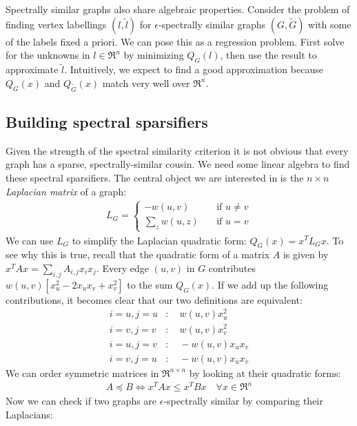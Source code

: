 \documentclass{article}
\begin{document}
Spectrally similar graphs also share algebraic properties. Consider the
problem of finding vertex labellings $(l, \tilde{l})$ for
$\epsilon$-spectrally similar graphs $(G, \tilde{G})$ with some of the
labels fixed a priori. We can pose this as a regression problem. First solve
for the unknowns in $l \in \Re^n$ by minimizing $Q_G(l)$, then use the
result to approximate $\tilde{l}$. Intuitively, we expect to find a good
approximation because $Q_G(x)$ and $Q_{\tilde{G}}(x)$ match very well over
$\Re^n$.

\subsection{Building spectral sparsifiers}

Given the strength of the spectral similarity criterion it is not obvious
that every graph has a sparse, spectrally-similar cousin. We need some
linear algebra to find these spectral sparsifiers. The central object we are
interested in is the $n \times n$ \textit{Laplacian matrix} of a graph:
\begin{align*}
    L_G =
    \begin{cases}
        -w(u, v) \quad &\text{if } u \not= v \\
        \sum_{z} w(u, z) \quad &\text{if } u = v
    \end{cases}
\end{align*}
We can use $L_G$ to simplify the Laplacian quadratic form: $Q_G(x) =
x^TL_Gx$. To see why this is true, recall that the quadratic form of a
matrix $A$ is given by $x^TAx = \sum_{i,j} A_{i,j}x_ix_j$.  Every edge $(u,
v)$ in $G$ contributes $w(u, v)[x_u^2 - 2x_ux_v + x_v^2]$ to the sum
$Q_G(x)$. If we add up the following contributions, it becomes clear that
our two definitions are equivalent:
\begin{align*}
    i = u, j = u &:\quad w(u, v)x_u^2 \\
    i = v, j = v &:\quad w(u, v)x_v^2 \\
    i = u, j = v &:\quad -w(u, v)x_ux_v \\
    i = v, j = u &:\quad -w(u, v)x_ux_v
\end{align*}
We can order symmetric matrices in $\Re^{n \times n}$ by looking at their
quadratic forms:
\begin{align*}
    A \preceq B \Leftrightarrow x^TAx \leq x^TBx \quad \forall{x \in \Re^n}
\end{align*}
Now we can check if two graphs are $\epsilon$-spectrally similar by
comparing their Laplacians:
\end{document}

